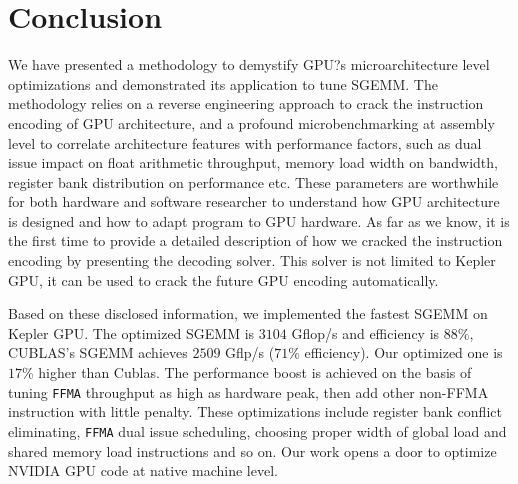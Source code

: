 \section{Conclusion}
\label{sec:conclusion}
We have presented a methodology to demystify GPU?s microarchitecture level optimizations and demonstrated its application to tune SGEMM. The methodology relies on a reverse engineering approach to crack the instruction encoding of GPU architecture, and a profound microbenchmarking at assembly level to correlate architecture features with performance factors, such as dual issue impact on float arithmetic throughput, memory load width on bandwidth, register bank distribution on performance etc. These parameters are worthwhile for both hardware and software researcher to understand how GPU architecture is designed and how to adapt program to GPU hardware. As far as we know, it is the first time to provide a detailed description of how we cracked the instruction encoding by presenting the decoding solver. This solver is not limited to Kepler GPU, it can be used to crack the future GPU encoding automatically.

Based on these disclosed information, we implemented the fastest SGEMM on Kepler GPU. The optimized SGEMM is $3104$ Gflop/s and efficiency is $88\%$, CUBLAS's SGEMM achieves $2509$ Gflp/s ($71\%$ efficiency). Our optimized one is $17\%$ higher than Cublas. The performance boost is achieved on the basis of tuning {\tt FFMA} throughput as high as hardware peak, then add other non-FFMA instruction with little penalty. These optimizations include register bank conflict eliminating, {\tt FFMA} dual issue scheduling, choosing proper width of global load and shared memory load instructions and so on. Our work opens a door to optimize NVIDIA GPU code at native machine level.

